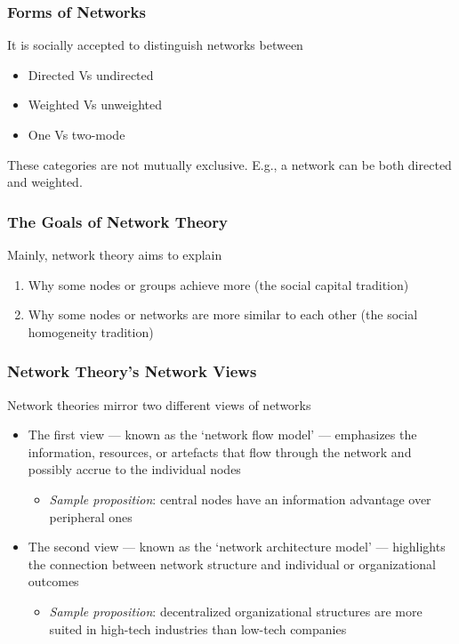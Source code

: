 \documentclass[notes, aspectratio=1610]{beamer}
\begin{document}
\begin{frame}
	\frametitle{Forms of Networks}
	It is socially accepted to distinguish networks between

	\begin{itemize}
		\item 
   		Directed Vs undirected
		\item
   		Weighted Vs unweighted
		\item  		
		One Vs two-mode
	\end{itemize}
	
	\vspace{1em}

	\begin{tcolorbox}[
		colback=comp_c!5!white,
		colframe=comp_c!90!black,
		title={\centering !! Pay attention !!}]
		These categories are not mutually exclusive. E.g., a network can be 
		both directed and weighted.
	\end{tcolorbox}
	
\end{frame}

\begin{frame}
	\frametitle{The Goals of Network Theory}
	Mainly, network theory aims to explain
	\begin{enumerate}
		\item Why some nodes or groups achieve more (the 
		social capital tradition)
		\item Why some nodes or  networks  are  more  similar  to  
		each  other  (the  social   homogeneity   tradition)
	\end{enumerate}
\end{frame}

\begin{frame}
	\frametitle{Network Theory's Network Views}

	Network theories mirror two different views of networks

	\begin{itemize}
		\item The first view --- known as the `network flow model' 
		--- emphasizes the information, resources, or artefacts 
		that flow through the network and possibly accrue to 
		the individual nodes
		\begin{itemize}
			\item \textit{Sample proposition}: central nodes have an information advantage
			over peripheral ones
		\end{itemize}
		\item The second view --- known as the `network architecture 
		model' --- highlights the connection between network structure 
		and individual or organizational outcomes  
		\begin{itemize}
			\item \textit{Sample proposition}: decentralized organizational 
			structures are more suited in high-tech industries than
			low-tech companies
		\end{itemize}
	\end{itemize}
\end{frame}
\end{document}
